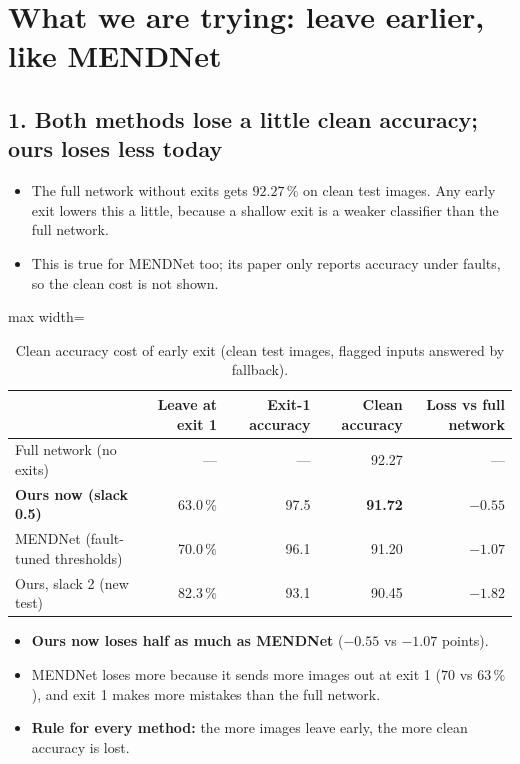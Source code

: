 \documentclass[10pt,a4paper]{article}
\begin{document}
\section{What we are trying: leave earlier, like MENDNet}

\subsection*{1. Both methods lose a little clean accuracy; ours loses less today}

\begin{itemize}
  \item The full network without exits gets $92.27\,\%$ on clean test images. Any early exit lowers this a little,
        because a shallow exit is a weaker classifier than the full network.
  \item This is true for MENDNet too; its paper only reports accuracy under faults, so the clean cost is not shown.
\end{itemize}

\begin{table}[H]
\centering\small
\caption{Clean accuracy cost of early exit (clean test images, flagged inputs answered by fallback).}
\label{tab:cleancost}
\begin{adjustbox}{max width=\linewidth}
\begin{tabular}{@{}lrrrr@{}}
\toprule
 & Leave at exit 1 & Exit-1 accuracy & Clean accuracy & Loss vs full network \\
\midrule
Full network (no exits)          & ---         & ---  & 92.27 & --- \\
\textbf{Ours now (slack 0.5)}    & 63.0\,\%   & 97.5 & \textbf{91.72} & $\mathbf{-0.55}$ \\
MENDNet (fault-tuned thresholds) & 70.0\,\%   & 96.1 & 91.20 & $-1.07$ \\
Ours, slack 2 (new test)         & 82.3\,\%   & 93.1 & 90.45 & $-1.82$ \\
\bottomrule
\end{tabular}
\end{adjustbox}
\end{table}

\begin{itemize}
  \item \textbf{Ours now loses half as much as MENDNet} ($-0.55$ vs $-1.07$ points).
  \item MENDNet loses more because it sends more images out at exit 1 ($70$ vs $63\,\%$), and exit 1 makes more
        mistakes than the full network.
  \item \textbf{Rule for every method:} the more images leave early, the more clean accuracy is lost.
\end{itemize}
\end{document}
